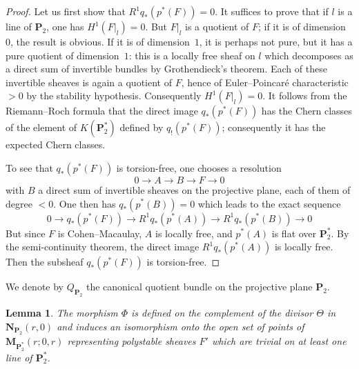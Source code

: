 \documentclass[12pt,english]{smfart}%
\theoremstyle{plain}
\newtheorem{lemma}[theorem]{Lemma}
\theoremstyle{definition}
\theoremstyle{remark}
\newcommand{\PP}{\mathbf{P}}
\begin{document}
\begin{proof}
Let us first show that $R^{1}q_{*}(p^{*}(F))=0$. It suffices to prove that if $l$ is a line of $\PP_{2}$, one has $H^{1}(F|_{l})=0$. But $F|_{l}$ is a quotient of $F$; if it is of dimension~$0$, the result is obvious. If it is of dimension~$1$, it is perhaps not pure, but it has a pure quotient of dimension~$1$: this is a locally free sheaf on $l$ which decomposes as a direct sum of invertible bundles by Grothendieck's theorem. Each of these invertible sheaves is again a quotient of $F$, hence of Euler--Poincar\'e characteristic $>0$ by the stability hypothesis. Consequently $H^{1}(F|_{l})=0$. It follows from the Riemann--Roch formula that the direct image $q_{*}(p^{*}(F))$ has the Chern classes of the element of $K(\PP_{2}^{*})$ defined by $q_{!}(p^{*}(F))$; consequently it has the expected Chern classes.

To see that $q_{*}(p^{*}(F))$ is torsion-free, one chooses a resolution
\[
0 \to A \to B \to F \to 0
\]
with $B$ a direct sum of invertible sheaves on the projective plane, each of them of degree $<0$. One then has $q_{*}(p^{*}(B))=0$ which leads to the exact sequence
\[
0 \to q_{*}(p^{*}(F)) \to R^{1}q_{*}(p^{*}(A)) \to R^{1}q_{*}(p^{*}(B)) \to 0
\]
But since $F$ is Cohen--Macaulay, $A$ is locally free, and $p^{*}(A)$ is flat over $\PP_{2}^{*}$. By the semi-continuity theorem, the direct image $R^{1}q_{*}(p^{*}(A))$ is locally free. Then the subsheaf $q_{*}(p^{*}(F))$ is torsion-free.
\end{proof}

We denote by $Q_{\PP_{2}}$ the canonical quotient bundle on the projective plane $\PP_{2}$.

\begin{lemma}\label{lem:Phi-defined}
The morphism $\Phi$ is defined on the complement of the divisor $\Theta$ in $\mathbf{N}_{\PP_{2}}(r,0)$ and induces an isomorphism onto the open set of points of $\mathbf{M}_{\PP_{2}^{*}}(r;0,r)$ representing polystable sheaves $F'$ which are trivial on at least one line of $\PP_{2}^{*}$.
\end{lemma}
\end{document}

